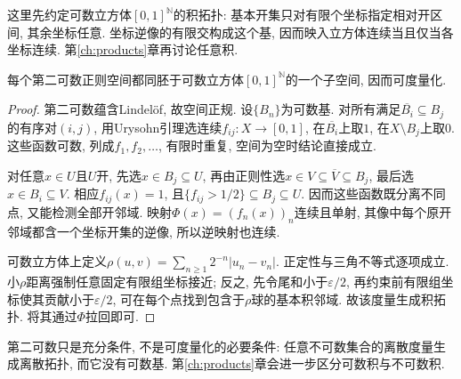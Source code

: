 这里先约定可数立方体$[0,1]^{\mathbb N}$的积拓扑: 基本开集只对有限个坐标指定相对开区间, 其余坐标任意. 坐标逆像的有限交构成这个基, 因而映入立方体连续当且仅当各坐标连续. 第\ref{ch:products}章再讨论任意积.
\begin{theorem}[第二可数正则空间的可度量化]\label{thm:metrization}
每个第二可数正则空间都同胚于可数立方体$[0,1]^{\mathbb N}$的一个子空间, 因而可度量化.
\end{theorem}
\begin{proof}
第二可数蕴含Lindel\"of, 故空间正规. 设$\{B_n\}$为可数基. 对所有满足$\overline{B_i}\subseteq B_j$的有序对$(i,j)$, 用Urysohn引理选连续$f_{ij}:X\to[0,1]$, 在$\overline{B_i}$上取$1$, 在$X\setminus B_j$上取$0$. 这些函数可数, 列成$f_1,f_2,\ldots$, 有限时重复, 空间为空时结论直接成立.

对任意$x\in U$且$U$开, 先选$x\in B_j\subseteq U$, 再由正则性选$x\in V\subseteq\overline V\subseteq B_j$, 最后选$x\in B_i\subseteq V$. 相应$f_{ij}(x)=1$, 且$\{f_{ij}>1/2\}\subseteq B_j\subseteq U$. 因而这些函数既分离不同点, 又能检测全部开邻域. 映射$\Phi(x)=(f_n(x))_n$连续且单射, 其像中每个原开邻域都含一个坐标开集的逆像, 所以逆映射也连续.

可数立方体上定义$\rho(u,v)=\sum_{n\ge1}2^{-n}|u_n-v_n|$. 正定性与三角不等式逐项成立. 小$\rho$距离强制任意固定有限组坐标接近; 反之, 先令尾和小于$\varepsilon/2$, 再约束前有限组坐标使其贡献小于$\varepsilon/2$, 可在每个点找到包含于$\rho$球的基本积邻域. 故该度量生成积拓扑. 将其通过$\Phi$拉回即可.
\end{proof}
第二可数只是充分条件, 不是可度量化的必要条件: 任意不可数集合的离散度量生成离散拓扑, 而它没有可数基. 第\ref{ch:products}章会进一步区分可数积与不可数积.


